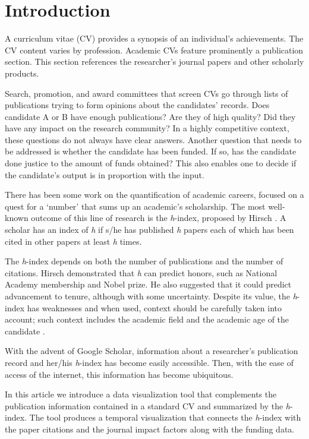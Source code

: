 \chapter{Introduction}\label{chap:Intro}

A curriculum vitae (CV) provides a synopsis of an individual's achievements. The CV content varies by profession. Academic CVs feature prominently a publication section. This section references the researcher's journal papers and other scholarly products.

Search, promotion, and award committees that screen CVs go through lists of publications trying to form opinions about the candidates' records. Does candidate A or B have enough publications? Are they of high quality? Did they have any impact on the research community?
In a highly competitive context, these questions do not always have clear answers. Another question that needs to be addressed is whether the candidate has been funded. If so, has the candidate done justice to the amount of funds obtained? This also enables one to decide if the candidate's output is in proportion with the input.

There has been some work on the quantification of academic careers, focused on a quest for a `number' that sums up an academic's scholarship. The most well-known outcome of this line of research is the {\it h}-index, proposed by Hirsch \cite{hirsch2005index}. A scholar has an index of {\it h} if s/he has published {\it h} papers each of which has been cited in other papers at least {\it h} times. 

The {\it h}-index depends on both the number of publications and the number of citations. Hirsch demonstrated that {\it h} can predict honors, such as National Academy membership and Nobel prize. He also suggested that it could predict advancement to tenure, although with some uncertainty.
Despite its value, the {\it h}-index has weaknesses and when used, context should be carefully taken into account; such context includes the academic field and the academic age of the candidate \cite{bornmann2009state}. 

With the advent of Google Scholar, information about a researcher's publication record and her/his {\it h}-index has become easily accessible. Then, with the ease of access of the internet, this information has become ubiquitous. 

In this article we introduce a data visualization tool that complements the publication information contained in a standard CV and summarized by the {\it h}-index. The tool produces a temporal visualization that connects the {\it h}-index with the paper citations and the journal impact factors along with the funding data. 

